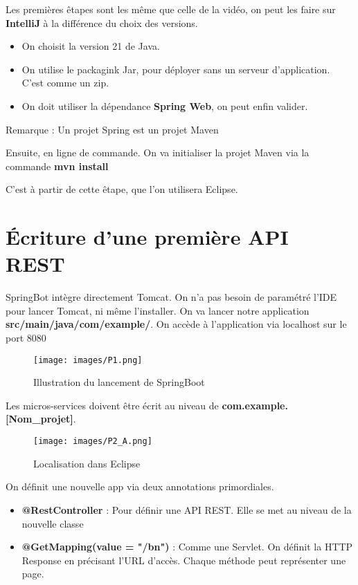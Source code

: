 \documentclass{rapport}
\begin{document}
Les premières êtapes sont les même que celle de la vidéo, on peut les faire sur \textbf{IntelliJ} à la différence du choix des versions.

\begin{itemize}
	\item On choisit la version 21 de Java.
	\item On utilise le packagink Jar, pour déployer sans un serveur d'application. C'est comme un zip. 
	\item On doit utiliser la dépendance \textbf{Spring Web}, on peut enfin valider.
\end{itemize}
Remarque :  Un projet Spring est un projet Maven\newline

Ensuite, en ligne de commande. On va initialiser la projet Maven via la commande \textbf{mvn install} 

C'est à partir de cette êtape, que l'on utilisera Eclipse. 


\section{Écriture d'une première API REST}

SpringBot intègre directement Tomcat. On n'a pas besoin de paramétré l'IDE pour lancer Tomcat, ni même l'installer. On va lancer notre application \textbf{src/main/java/com/example/}. On accède à l'application via localhost sur le port 8080

\begin{figure}[H]
	\centering
    \texttt{[image: images/P1.png]}
    \caption{Illustration du lancement de SpringBoot}
\end{figure}

Les micros-services doivent être écrit au niveau de \textbf{com.example.[Nom\_projet]}. 

\begin{figure}[H]
	\centering
    \texttt{[image: images/P2\_A.png]}
    \caption{Localisation dans Eclipse}
\end{figure}

On définit une nouvelle app via deux annotations primordiales.
\begin{itemize}
	\item \textbf{@RestController} : Pour définir une API REST. Elle se met au niveau de la nouvelle classe
	\item \textbf{@GetMapping(value = "/bn")} : Comme une Servlet. On définit la HTTP Response en précisant l'URL d'accès. Chaque méthode peut représenter une page.
\end{itemize}
\end{document}
